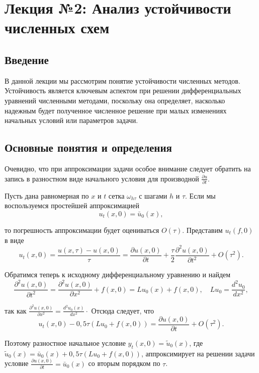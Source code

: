 \section*{Лекция №2: Анализ устойчивости численных схем}

\subsection*{Введение}

В данной лекции мы рассмотрим понятие устойчивости численных методов. Устойчивость является ключевым аспектом при решении дифференциальных уравнений численными методами, поскольку она определяет, насколько надежным будет полученное численное решение при малых изменениях начальных условий или параметров задачи.

\subsection*{Основные понятия и определения}


Очевидно, что при аппроксимации задачи особое внимание следует обратить на запись в разностном виде начального условия для производной $\frac{\partial u}{\partial t}$.

Пусть дана равномерная по $x$ и $t$ сетка $\omega_{h \tau}$ с шагами $h$ и $\tau$. Если мы воспользуемся простейшей аппроксимацией
$$
u_t(x, 0)=\bar{u}_0(x),
$$

то погрешность аппроксимации будет оцениваться $O(\tau)$. Представим $u_t(f, 0)$ в виде
$$
u_t(x, 0)=\frac{u(x, \tau)-u(x, 0)}{\tau}=\frac{\partial u(x, 0)}{\partial t}+\frac{\tau}{2} \frac{\partial^2 u(x, 0)}{\partial t^2}+O\left(\tau^2\right) .
$$

Обратимся теперь к исходному дифференциальному уравнению и найдем
$$
\frac{\partial^2 u(x, 0)}{\partial t^2}=\frac{\partial^2 u(x, 0)}{\partial x^2}+f(x, 0)=L u_0(x)+f(x, 0), \quad L u_0=\frac{d^2 u_0}{d x^2},
$$

так как $\frac{\partial^2 u(x, 0)}{\partial x^2}=\frac{d^2 u_0(x)}{d x^2} \cdot$ Отсюда следует, что
$$
u_t(x, 0)-0,5 \tau\left(L u_0+f(x, 0)\right)=\frac{\partial u(x, 0)}{\partial t}+O\left(\tau^2\right) .
$$

Поэтому разностное начальное условие $y_t(x, 0)=\tilde{u}_0(x)$, где $\tilde{u}_0(x)=\bar{u}_0(x)+0,5 \tau\left(L u_0+f(x, 0)\right)$, аппроксимирует на решении задачи условие $\frac{\partial u(x, 0)}{\partial t}=\bar{u}_0(x)$ со вторым порядком по $\tau$.

